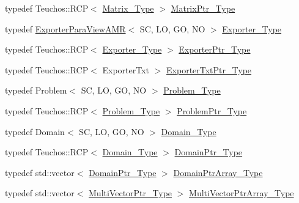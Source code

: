 \begin{DoxyCompactItemize}
\item 
typedef Teuchos\+::\+R\+CP$<$ \hyperlink{classFEDD_1_1AdaptiveMeshRefinement_a607791df1d84bc4ea9fc08acd31225c7}{Matrix\+\_\+\+Type} $>$ \hyperlink{classFEDD_1_1AdaptiveMeshRefinement_a862a72ab4878d57a61b746f5ac8d0b6c}{Matrix\+Ptr\+\_\+\+Type}
\item 
typedef \hyperlink{classFEDD_1_1ExporterParaViewAMR}{Exporter\+Para\+View\+A\+MR}$<$ SC, LO, GO, NO $>$ \hyperlink{classFEDD_1_1AdaptiveMeshRefinement_a3f493149d664db5c1024f27f87f0ac15}{Exporter\+\_\+\+Type}
\item 
typedef Teuchos\+::\+R\+CP$<$ \hyperlink{classFEDD_1_1AdaptiveMeshRefinement_a3f493149d664db5c1024f27f87f0ac15}{Exporter\+\_\+\+Type} $>$ \hyperlink{classFEDD_1_1AdaptiveMeshRefinement_ac8cda8533e68f9049ede0208be2175d6}{Exporter\+Ptr\+\_\+\+Type}
\item 
typedef Teuchos\+::\+R\+CP$<$ Exporter\+Txt $>$ \hyperlink{classFEDD_1_1AdaptiveMeshRefinement_afc81b6919eb7756e16e696631e0d666b}{Exporter\+Txt\+Ptr\+\_\+\+Type}
\item 
typedef Problem$<$ SC, LO, GO, NO $>$ \hyperlink{classFEDD_1_1AdaptiveMeshRefinement_a88c7a8713a81d90ff9d82a08ba596cda}{Problem\+\_\+\+Type}
\item 
typedef Teuchos\+::\+R\+CP$<$ \hyperlink{classFEDD_1_1AdaptiveMeshRefinement_a88c7a8713a81d90ff9d82a08ba596cda}{Problem\+\_\+\+Type} $>$ \hyperlink{classFEDD_1_1AdaptiveMeshRefinement_a442c6ca5dc4d866e3b1c6cdb613e2281}{Problem\+Ptr\+\_\+\+Type}
\item 
typedef Domain$<$ SC, LO, GO, NO $>$ \hyperlink{classFEDD_1_1AdaptiveMeshRefinement_a894158e6863753ca565eabb915e25d9a}{Domain\+\_\+\+Type}
\item 
typedef Teuchos\+::\+R\+CP$<$ \hyperlink{classFEDD_1_1AdaptiveMeshRefinement_a894158e6863753ca565eabb915e25d9a}{Domain\+\_\+\+Type} $>$ \hyperlink{classFEDD_1_1AdaptiveMeshRefinement_a98b097661d0e4c38e4182582078e2cd6}{Domain\+Ptr\+\_\+\+Type}
\item 
typedef std\+::vector$<$ \hyperlink{classFEDD_1_1AdaptiveMeshRefinement_a98b097661d0e4c38e4182582078e2cd6}{Domain\+Ptr\+\_\+\+Type} $>$ \hyperlink{classFEDD_1_1AdaptiveMeshRefinement_a581823e939bbec9e9a52a23d59d5c06a}{Domain\+Ptr\+Array\+\_\+\+Type}
\item 
typedef std\+::vector$<$ \hyperlink{classFEDD_1_1AdaptiveMeshRefinement_af4fb11adbdf1bba9bcaf8952324d32f2}{Multi\+Vector\+Ptr\+\_\+\+Type} $>$ \hyperlink{classFEDD_1_1AdaptiveMeshRefinement_ab682c21b2aedae4d190d83018fa93df0}{Multi\+Vector\+Ptr\+Array\+\_\+\+Type}

\end{DoxyCompactItemize}
